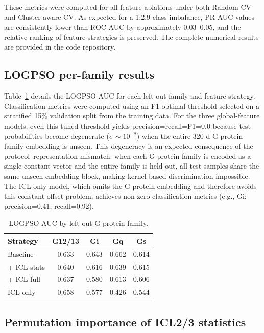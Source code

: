 \documentclass[11pt,a4paper]{article}
\begin{document}
These metrics were computed for all feature ablations under both Random CV and Cluster-aware CV. As expected for a 1:2.9 class imbalance, PR-AUC values are consistently lower than ROC-AUC by approximately 0.03--0.05, and the relative ranking of feature strategies is preserved. The complete numerical results are provided in the code repository.

\subsection{LOGPSO per-family results}

Table~\ref{tab:logpso} details the LOGPSO AUC for each left-out family and feature strategy. Classification metrics were computed using an F1-optimal threshold selected on a stratified 15\% validation split from the training data. For the three global-feature models, even this tuned threshold yields precision=recall=F1=0.0 because test probabilities become degenerate ($\sigma \sim 10^{-8}$) when the entire 320-d G-protein family embedding is unseen. This degeneracy is an expected consequence of the protocol--representation mismatch: when each G-protein family is encoded as a single constant vector and the entire family is held out, all test samples share the same unseen embedding block, making kernel-based discrimination impossible. The ICL-only model, which omits the G-protein embedding and therefore avoids this constant-offset problem, achieves non-zero classification metrics (e.g., Gi: precision=0.41, recall=0.92).

\begin{table}[H]
\centering
\caption{LOGPSO AUC by left-out G-protein family.}
\label{tab:logpso}
\begin{tabular}{lcccc}
\toprule
\textbf{Strategy} & \textbf{G12/13} & \textbf{Gi} & \textbf{Gq} & \textbf{Gs} \\
\midrule
Baseline & 0.633 & 0.643 & 0.662 & 0.614 \\
+ ICL stats & 0.640 & 0.616 & 0.639 & 0.615 \\
+ ICL full & 0.637 & 0.580 & 0.613 & 0.606 \\
ICL only & 0.658 & 0.577 & 0.426 & 0.544 \\
\bottomrule
\end{tabular}
\end{table}

\subsection{Permutation importance of ICL2/3 statistics}
\end{document}
